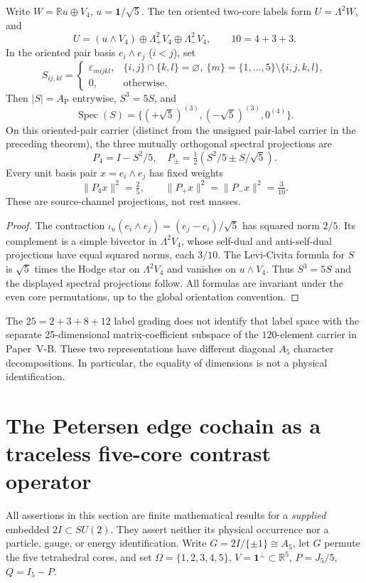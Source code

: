 \documentclass[11pt]{article}
\begin{document}
\begin{theorem}
\label{p1:thm:v338-signed-petersen-hodge}
Write $W=\mathbb Ru\oplus V_4$, $u=\mathbf1/\sqrt5$.
The ten oriented two-core labels form $U=\Lambda^2W$, and
\[
 U=(u\wedge V_4)\oplus\Lambda^2_+V_4\oplus\Lambda^2_-V_4,
 \qquad 10=4+3+3.
\]
In the oriented pair basis $e_i\wedge e_j$ ($i<j$), set
\[
 S_{ij,kl}=\begin{cases}
  \varepsilon_{mijkl},&\{i,j\}\cap\{k,l\}=\varnothing,
    \ \{m\}=\{1,\ldots,5\}\setminus\{i,j,k,l\},\\
  0,&\text{otherwise}.
 \end{cases}
\]
Then $|S|=A_{\mathrm P}$ entrywise, $S^3=5S$, and
\[
 \operatorname{Spec}(S)=\{(+\sqrt5)^{(3)},(-\sqrt5)^{(3)},0^{(4)}\}.
\]
On this oriented-pair carrier (distinct from the unsigned pair-label
carrier in the preceding theorem), the three mutually orthogonal
spectral projections are
\[
 P_{4}=I-S^2/5,\quad
 P_{\pm}=\tfrac12(S^2/5\pm S/\sqrt5).
\]
Every unit basis pair $x=e_i\wedge e_j$ has fixed weights
\[
 \|P_4x\|^2=\tfrac25,\qquad
 \|P_+x\|^2=\|P_-x\|^2=\tfrac3{10}.
\]
These are source-channel projections, not rest masses.
\end{theorem}
\begin{proof}
The contraction $\iota_u(e_i\wedge e_j)=(e_j-e_i)/\sqrt5$
has squared norm $2/5$.  Its complement is a simple bivector in
$\Lambda^2V_4$, whose self-dual and anti-self-dual projections have
equal squared norms, each $3/10$.  The Levi-Civita formula for $S$
is $\sqrt5$ times the Hodge star on $\Lambda^2V_4$ and vanishes
on $u\wedge V_4$.  Thus $S^3=5S$ and the displayed spectral
projections follow.  All formulas are invariant under the even
core permutations, up to the global orientation convention.
\end{proof}
\begin{remark}
The $25=2+3+8+12$ label grading does not identify that label
space with the separate 25-dimensional matrix-coefficient subspace
of the $120$-element carrier in Paper~V-B.  These two representations
have different diagonal $A_5$ character decompositions.  In
particular, the equality of dimensions is not a physical identification.
\end{remark}


\section{The Petersen edge cochain as a traceless five-core contrast operator}
\label{p1:sec:v339-petersen-endomorphism-bridge}
All assertions in this section are finite mathematical results for a
\emph{supplied} embedded $2I\subset SU(2)$.  They assert neither its
physical occurrence nor a particle, gauge, or energy identification.
Write $G=2I/\{\pm1\}\cong A_5$, let $G$ permute the five tetrahedral
cores, and set $\Omega=\{1,2,3,4,5\}$,
$V=\mathbf1^\perp\subset\mathbb R^5$, $P=J_5/5$, $Q=I_5-P$.
\end{document}
